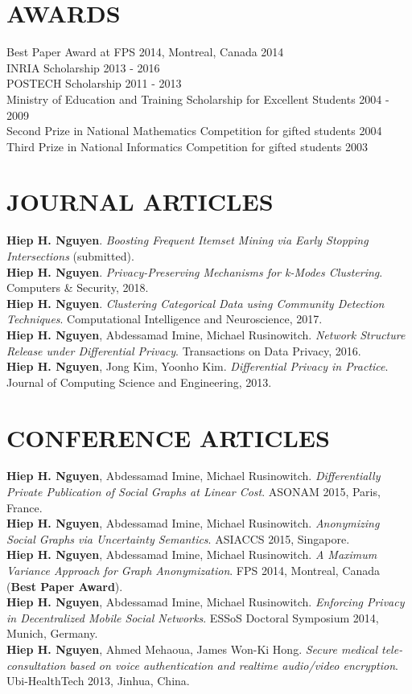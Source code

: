 \documentclass[margin, 10pt]{res} %
\begin{document}
\begin{resume}
 
\section{AWARDS}
Best Paper Award at FPS 2014, Montreal, Canada											\hfill 2014 \\
INRIA Scholarship																		\hfill 2013 - 2016 \\
POSTECH Scholarship																		\hfill 2011 - 2013 \\
Ministry of Education and Training Scholarship for Excellent Students 					\hfill 2004 - 2009 \\
Second Prize in National Mathematics Competition for gifted students					\hfill 2004 \\
Third Prize in National Informatics Competition for gifted students						\hfill 2003 


\section{JOURNAL ARTICLES}
\textbf{Hiep H. Nguyen}. \textit{Boosting Frequent Itemset Mining via Early Stopping Intersections} (submitted). \\
\textbf{Hiep H. Nguyen}. \textit{Privacy-Preserving Mechanisms for k-Modes Clustering}. Computers \& Security, 2018. \\
\textbf{Hiep H. Nguyen}. \textit{Clustering Categorical Data using Community Detection Techniques}. Computational Intelligence and Neuroscience, 2017. \\
\textbf{Hiep H. Nguyen}, Abdessamad Imine, Michael Rusinowitch. \textit{Network Structure Release under Differential Privacy}. Transactions on Data Privacy, 2016. \\
\textbf{Hiep H. Nguyen}, Jong Kim, Yoonho Kim. \textit{Differential Privacy in Practice}. Journal of Computing Science and Engineering, 2013.

\section{CONFERENCE ARTICLES}
\textbf{Hiep H. Nguyen}, Abdessamad Imine, Michael Rusinowitch. \textit{Differentially Private Publication of Social Graphs at Linear Cost}. ASONAM 2015, Paris, France. \\
\textbf{Hiep H. Nguyen}, Abdessamad Imine, Michael Rusinowitch. \textit{Anonymizing Social Graphs via Uncertainty Semantics}. ASIACCS 2015, Singapore. \\
\textbf{Hiep H. Nguyen}, Abdessamad Imine, Michael Rusinowitch. \textit{A Maximum Variance Approach for Graph Anonymization}. FPS 2014, Montreal, Canada (\textbf{Best Paper Award}). \\
\textbf{Hiep H. Nguyen}, Abdessamad Imine, Michael Rusinowitch. \textit{Enforcing Privacy in Decentralized Mobile Social Networks}. ESSoS Doctoral Symposium 2014, Munich, Germany. \\
\textbf{Hiep H. Nguyen}, Ahmed Mehaoua, James Won-Ki Hong. \textit{Secure medical tele-consultation based on voice authentication and realtime audio/video encryption}. Ubi-HealthTech 2013, Jinhua, China.


\end{resume}
\end{document}
